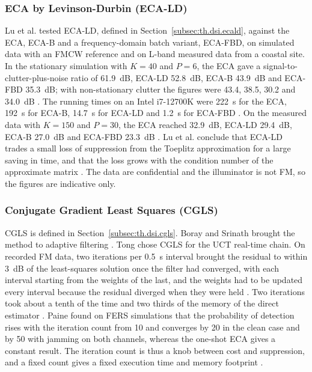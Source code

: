 \subsubsection{ECA by Levinson-Durbin (ECA-LD)}
\label{subsubsec:ch2.chain.dsi.ecald}
\todo{}
Lu et al. \citep{lu2026} tested ECA-LD, defined in Section~\ref{subsec:th.dsi.ecald}, against the ECA, ECA-B and a frequency-domain batch variant, ECA-FBD, on simulated data with an FMCW reference and on L-band measured data from a coastal site. In the stationary simulation with $K = 40$ and $P = 6$, the ECA gave a signal-to-clutter-plus-noise ratio of 61.9~dB, ECA-LD 52.8~dB, ECA-B 43.9~dB and ECA-FBD 35.3~dB; with non-stationary clutter the figures were 43.4, 38.5, 30.2 and 34.0~dB \citep{lu2026}. The running times on an Intel i7-12700K were 222~s for the ECA, 192~s for ECA-B, 14.7~s for ECA-LD and 1.2~s for ECA-FBD \citep{lu2026}. On the measured data with $K = 150$ and $P = 30$, the ECA reached 32.9~dB, ECA-LD 29.4~dB, ECA-B 27.0~dB and ECA-FBD 23.3~dB \citep{lu2026}. Lu et al. conclude that ECA-LD trades a small loss of suppression from the Toeplitz approximation for a large saving in time, and that the loss grows with the condition number of the approximate matrix \citep{lu2026}. The data are confidential and the illuminator is not FM, so the figures are indicative only.

\subsubsection{Conjugate Gradient Least Squares (CGLS)}
\label{subsubsec:ch2.chain.dsi.cgls}
\todo{}
CGLS is defined in Section~\ref{subsec:th.dsi.cgls}. Boray and Srinath brought the method to adaptive filtering \citep{boray1992} . Tong \citep{tong2014} chose CGLS for the UCT real-time chain. On recorded FM data, two iterations per 0.5~s interval brought the residual to within 3~dB of the least-squares solution once the filter had converged, with each interval starting from the weights of the last, and the weights had to be updated every interval because the residual diverged when they were held \citep{tong2014}. Two iterations took about a tenth of the time and two thirds of the memory of the direct estimator \citep{tong2014}. Paine \citep{paine2019a} found on FERS simulations that the probability of detection rises with the iteration count from 10 and converges by 20 in the clean case and by 50 with jamming on both channels, whereas the one-shot ECA gives a constant result. The iteration count is thus a knob between cost and suppression, and a fixed count gives a fixed execution time and memory footprint \citep{tong2014,schuepbach2020}.

